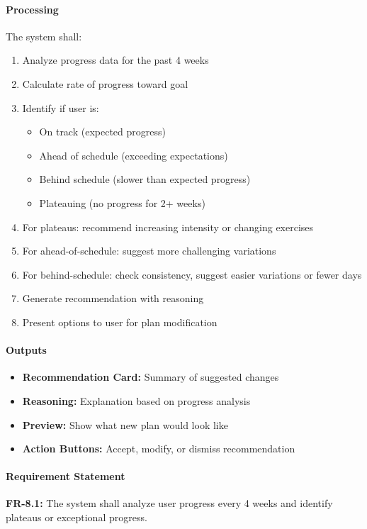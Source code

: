 \documentclass[12pt,a4paper]{article}
\begin{document}
\paragraph{Processing}
The system shall:
\begin{enumerate}
    \item Analyze progress data for the past 4 weeks
    \item Calculate rate of progress toward goal
    \item Identify if user is:
    \begin{itemize}
        \item On track (expected progress)
        \item Ahead of schedule (exceeding expectations)
        \item Behind schedule (slower than expected progress)
        \item Plateauing (no progress for 2+ weeks) %
    \end{itemize}
    \item For plateaus: recommend increasing intensity or changing exercises
    \item For ahead-of-schedule: suggest more challenging variations
    \item For behind-schedule: check consistency, suggest easier variations or fewer days
    \item Generate recommendation with reasoning
    \item Present options to user for plan modification
\end{enumerate}

\paragraph{Outputs}
\begin{itemize}
    \item \textbf{Recommendation Card:} Summary of suggested changes
    \item \textbf{Reasoning:} Explanation based on progress analysis
    \item \textbf{Preview:} Show what new plan would look like
    \item \textbf{Action Buttons:} Accept, modify, or dismiss recommendation
\end{itemize}

\paragraph{Requirement Statement}
\textbf{FR-8.1:} The system shall analyze user progress every 4 weeks and identify plateaus or exceptional progress.
\end{document}
